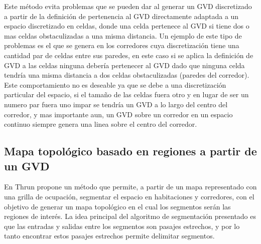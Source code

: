 
Este método evita problemas que se pueden dar al generar un GVD discretizado a partir de la definición de pertenencia al GVD directamente adaptada a un espacio discretizado en celdas, donde una celda pertenece al GVD si tiene dos o mas celdas obstaculizadas a una misma distancia. Un ejemplo de este tipo de problemas es el que se genera en los corredores cuya discretización tiene una cantidad par de celdas entre sus paredes, en este caso si se aplica la definición de GVD a las celdas ninguna debería pertenecer al GVD dado que ninguna celda tendría una misma distancia a dos celdas obstaculizadas (paredes del corredor). Este comportamiento no es deseable ya que se debe a una discretización particular del espacio, si el tamaño de las celdas fuera otro y en lugar de ser un numero par fuera uno impar se tendría un GVD a lo largo del centro del corredor, y mas importante aun, un GVD sobre un corredor en un espacio continuo siempre genera una linea sobre el centro del corredor. %



\subsection{Mapa topológico basado en regiones a partir de un GVD}\label{subsec:mapaTopGVD}
En \cite{Thrun1998} Thrun propone un método que permite, a partir de un mapa representado con una grilla de ocupación, segmentar el espacio en habitaciones y corredores, con el objetivo de generar un mapa topológico en el cual los segmentos serán las regiones de interés. La idea principal del algoritmo de segmentación presentado es que las entradas y salidas entre los segmentos son pasajes estrechos, y por lo tanto encontrar estos pasajes estrechos permite delimitar segmentos.

